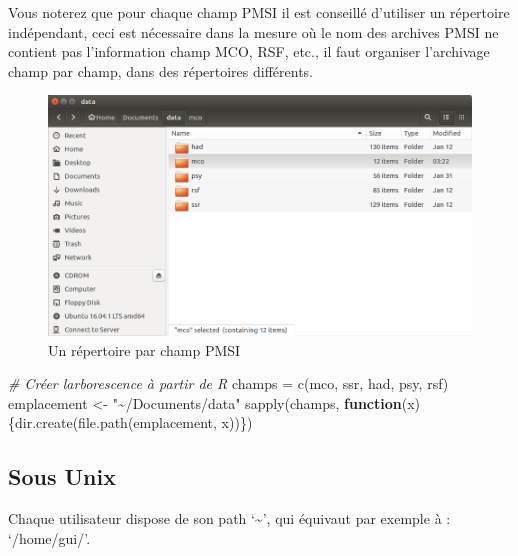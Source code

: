 \documentclass[
]{book}
\newenvironment{Shaded}{\begin{snugshade}}{\end{snugshade}}
\newcommand{\CommentTok}[1]{\textcolor[rgb]{0.56,0.35,0.01}{\textit{#1}}}
\newcommand{\ControlFlowTok}[1]{\textcolor[rgb]{0.13,0.29,0.53}{\textbf{#1}}}
\newcommand{\FunctionTok}[1]{\textcolor[rgb]{0.00,0.00,0.00}{#1}}
\newcommand{\NormalTok}[1]{#1}
\newcommand{\OtherTok}[1]{\textcolor[rgb]{0.56,0.35,0.01}{#1}}
\newcommand{\StringTok}[1]{\textcolor[rgb]{0.31,0.60,0.02}{#1}}
\begin{document}
Vous noterez que pour chaque champ PMSI il est conseillé d'utiliser un répertoire indépendant, ceci est nécessaire dans la mesure où le nom des archives PMSI ne contient pas l'information champ MCO, RSF, etc., il faut organiser l'archivage champ par champ, dans des répertoires différents.

\begin{figure}
\centering
\includegraphics{images/champ_par_champ.png}
\caption{Un répertoire par champ PMSI}
\end{figure}

\begin{Shaded}
\begin{Highlighting}[]
\CommentTok{\# Créer l\textquotesingle{}arborescence à partir de R}
\NormalTok{champs }\OtherTok{=} \FunctionTok{c}\NormalTok{(}\StringTok{\textquotesingle{}mco\textquotesingle{}}\NormalTok{, }\StringTok{\textquotesingle{}ssr\textquotesingle{}}\NormalTok{, }\StringTok{\textquotesingle{}had\textquotesingle{}}\NormalTok{, }\StringTok{\textquotesingle{}psy\textquotesingle{}}\NormalTok{, }\StringTok{\textquotesingle{}rsf\textquotesingle{}}\NormalTok{)}
\NormalTok{emplacement }\OtherTok{\textless{}{-}} \StringTok{"\textasciitilde{}/Documents/data"}
\FunctionTok{sapply}\NormalTok{(champs, }\ControlFlowTok{function}\NormalTok{(x)\{}\FunctionTok{dir.create}\NormalTok{(}\FunctionTok{file.path}\NormalTok{(emplacement, x))\})}
\end{Highlighting}
\end{Shaded}

\hypertarget{sous-unix}{%
\subsection{Sous Unix}\label{sous-unix}}

Chaque utilisateur dispose de son path `\textasciitilde{}', qui équivaut par exemple à : `/home/gui/'.
\end{document}
